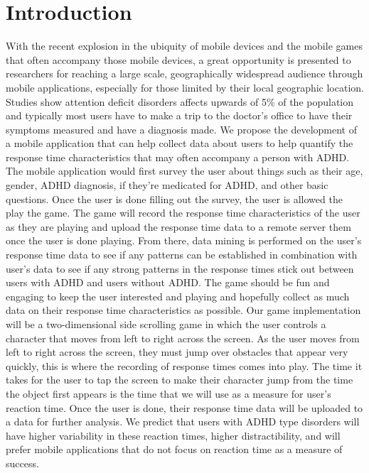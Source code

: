 \documentclass[a4wide]{article}
\begin{document}
\section{Introduction}
\- With the recent explosion in the ubiquity of mobile devices and the mobile games that often accompany those mobile devices, a great opportunity is presented to researchers for reaching a large scale, geographically widespread audience through mobile applications, especially for those limited by their local geographic location. Studies show attention deficit disorders affects upwards of 5\% of the population and typically most users have to make a trip to the doctor's office to have their symptoms measured and have a diagnosis made.
\newline
\newline
\- We propose the development of a mobile application that can help collect data about users to help quantify the response time characteristics that may often accompany a person with ADHD. The mobile application would first survey the user about things such as their age, gender, ADHD diagnosis, if they're medicated for ADHD, and other basic questions. Once the user is done filling out the survey, the user is allowed the play the game. The game will record the response time characteristics of the user as they are playing and upload the response time data to a remote server them once the user is done playing. From there, data mining is performed on the user’s response time data to see if any patterns can be established in combination with user's data to see if any strong patterns in the response times stick out between users with ADHD and users without ADHD. The game should be fun and engaging to keep the user interested and playing and hopefully collect as much data on their response time characteristics as possible.
\newline
\newline
\- Our game implementation will be a two-dimensional side scrolling game in which the user controls a character that moves from left to right across the screen. As the user moves from left to right across the screen, they must jump over obstacles that appear very quickly, this is where the recording of response times comes into play. The time it takes for the user to tap the screen to make their character jump from the time the object first appears is the time that we will use as a measure for user's reaction time. Once the user is done, their response time data will be uploaded to a data for further analysis. We predict that users with ADHD type disorders will have higher variability in these reaction times, higher distractibility, and will prefer mobile applications that do not focus on reaction time as a measure of success.
\end{document}
